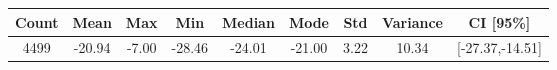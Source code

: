 \begin{tabular}{|c|c|c|c|c|c|c|c|c|}\hline
\rowcolor{Plum!20}
Count&Mean&Max&Min&Median&Mode&Std&Variance&CI [95\%]\\\hline\hline
4499&-20.94&-7.00&-28.46&-24.01&-21.00&3.22&10.34&[-27.37,-14.51]\\\hline
\end{tabular}
